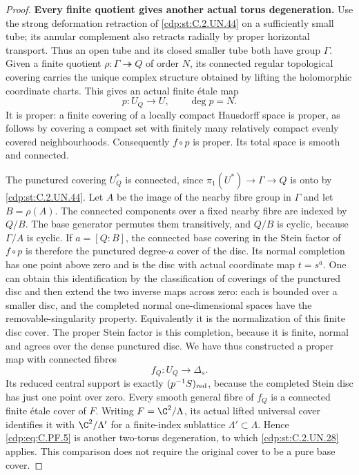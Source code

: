 \begin{proof}
\par\medskip\noindent\textbf{Every finite quotient gives another actual torus degeneration.}
Use the strong deformation retraction of \ref{cdp:st:C.2.UN.44} on a sufficiently
small tube; its annular complement also retracts radially by proper
horizontal transport. Thus an open tube and its closed smaller
tube both have group $\Gamma$. Given a finite quotient
$\rho:\Gamma\twoheadrightarrow Q$ of order $N$, its connected
regular topological covering carries the unique complex structure
obtained by lifting the holomorphic coordinate charts. This gives
an actual finite \'{e}tale map
\[
                     p:U_Q\longrightarrow U,\qquad \deg p=N.
                                                        \tag{C.PF.4}\label{cdp:eq:C.PF.4}
\]
It is proper: a finite covering of a locally compact Hausdorff
space is proper, as follows by covering a compact set with
finitely many relatively compact evenly covered neighbourhoods.
Consequently $f\circ p$ is proper. Its total space is smooth and
connected.

The punctured covering $U_Q^*$ is connected, since
$\pi_1(U^*)\to\Gamma\to Q$ is onto by \ref{cdp:st:C.2.UN.44}. Let $A$ be the image
of the nearby fibre group in $\Gamma$ and let $B=\rho(A)$.
The connected components over a fixed nearby fibre are indexed
by $Q/B$. The base generator permutes them transitively, and
$Q/B$ is cyclic, because $\Gamma/A$ is cyclic. If
$a=[Q:B]$, the connected base covering in the Stein factor of
$f\circ p$ is therefore the punctured degree-$a$ cover of the disc.
Its normal completion has one point above zero and is the disc
with actual coordinate map $t=s^a$. One can obtain this
identification by the classification of coverings of the
punctured disc and then extend the two inverse maps across zero:
each is bounded over a smaller disc, and the completed normal
one-dimensional spaces have the removable-singularity property.
Equivalently it is the normalization of this finite disc cover.
The proper Stein factor is this completion, because it is finite,
normal and agrees over the dense punctured disc. We have thus
constructed a proper map with connected fibres
\[
                        f_Q:U_Q\longrightarrow\Delta_s .
                                                        \tag{C.PF.5}\label{cdp:eq:C.PF.5}
\]
Its reduced central support is exactly $(p^{-1}S)_{\rm red}$,
because the completed Stein disc has just one point over zero.
Every smooth general fibre of $f_Q$ is a connected finite \'{e}tale
cover of $F$. Writing $F=\C^2/\Lambda$, its actual lifted universal
cover identifies it with $\C^2/\Lambda'$ for a finite-index
sublattice $\Lambda'\subset\Lambda$. Hence \eqref{cdp:eq:C.PF.5} is another
two-torus degeneration, to which \ref{cdp:st:C.2.UN.28} applies. This comparison
does not require the original cover to be a pure base cover.


\end{proof}
